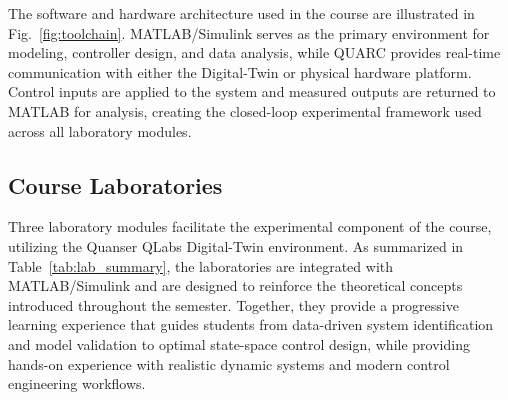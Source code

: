 \documentclass[journal]{IEEEtran}
\begin{document}
The software and hardware architecture used in the course are illustrated in Fig.~\ref{fig:toolchain}. MATLAB/Simulink serves as the primary environment for modeling, controller design, and data analysis, while QUARC provides real-time communication with either the Digital-Twin or physical hardware platform. Control inputs are applied to the system and measured outputs are returned to MATLAB for analysis, creating the closed-loop experimental framework used across all laboratory modules.




\subsection{Course Laboratories}


Three laboratory modules facilitate the experimental component of the course, utilizing the Quanser QLabs Digital-Twin environment. As summarized in Table~\ref{tab:lab_summary}, the laboratories are integrated with MATLAB/Simulink and are designed to reinforce the theoretical concepts introduced throughout the semester. Together, they provide a progressive learning experience that guides students from data-driven system identification and model validation to optimal state-space control design, while providing hands-on experience with realistic dynamic systems and modern control engineering workflows.
\end{document}
